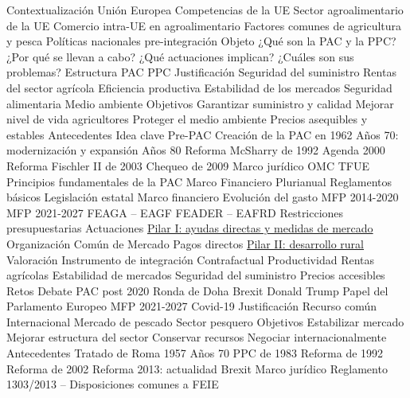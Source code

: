 \documentclass{nuevotema}
\begin{document}
\esquemacorto

\begin{esquema}[enumerate]
	\1[] 
		\2 Contextualización
			\3 Unión Europea
			\3 Competencias de la UE
			\3 Sector agroalimentario de la UE
			\3 Comercio intra-UE en agroalimentario
			\3 Factores comunes de agricultura y pesca
			\3 Políticas nacionales pre-integración
		\2 Objeto
			\3 ¿Qué son la PAC y la PPC?
			\3 ¿Por qué se llevan a cabo?
			\3 ¿Qué actuaciones implican?
			\3 ¿Cuáles son sus problemas?
		\2 Estructura
			\3 PAC
			\3 PPC
	\1 
		\2 Justificación
			\3 Seguridad del suministro
			\3 Rentas del sector agrícola
			\3 Eficiencia productiva
			\3 Estabilidad de los mercados
			\3 Seguridad alimentaria
			\3 Medio ambiente
		\2 Objetivos
			\3 Garantizar suministro y calidad
			\3 Mejorar nivel de vida agricultores
			\3 Proteger el medio ambiente
			\3 Precios asequibles y estables
		\2 Antecedentes
			\3 Idea clave
			\3 Pre-PAC
			\3 Creación de la PAC en 1962
			\3 Años 70: modernización y expansión
			\3 Años 80
			\3  Reforma McSharry de 1992
			\3 Agenda 2000
			\3 Reforma Fischler II de 2003
			\3 Chequeo de 2009
		\2 Marco jurídico
			\3 OMC
			\3 TFUE
			\3 Principios fundamentales de la PAC
			\3 Marco Financiero Plurianual
			\3 Reglamentos básicos
			\3 Legislación estatal
		\2 Marco financiero
			\3 Evolución del gasto
			\3 MFP 2014-2020
			\3 MFP 2021-2027
			\3 FEAGA -- EAGF
			\3 FEADER -- EAFRD
			\3 Restricciones presupuestarias
		\2 Actuaciones
			\3 \underline{Pilar I: ayudas directas y medidas de mercado}
			\3 {Organización Común de Mercado}
			\3 {Pagos directos}
			\3 \underline{Pilar II: desarrollo rural}
		\2 Valoración
			\3 Instrumento de integración
			\3 Contrafactual
			\3 Productividad
			\3 Rentas agrícolas
			\3 Estabilidad de mercados
			\3 Seguridad del suministro
			\3 Precios accesibles
		\2 Retos
			\3 Debate PAC post 2020
			\3 Ronda de Doha
			\3 Brexit
			\3 Donald Trump
			\3 Papel del Parlamento Europeo
			\3 MFP 2021-2027
			\3 Covid-19
	\1 
		\2 Justificación
			\3 Recurso común
			\3 Internacional
			\3 Mercado de pescado
			\3 Sector pesquero
		\2 Objetivos
			\3 Estabilizar mercado
			\3 Mejorar estructura del sector
			\3 Conservar recursos
			\3 Negociar internacionalmente
		\2 Antecedentes
			\3 Tratado de Roma 1957
			\3 Años 70
			\3 PPC de 1983
			\3 Reforma de 1992
			\3 Reforma de 2002
			\3 Reforma 2013: actualidad
			\3 Brexit
		\2 Marco jurídico
			\3 Reglamento 1303/2013 -- Disposiciones comunes a FEIE

\end{esquema}
\end{document}
